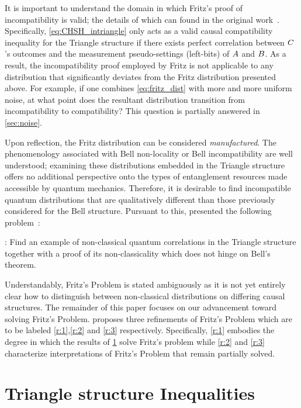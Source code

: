 \documentclass[aps, 10pt, english, twoside, pra, nofootinbib, tightenlines, longbibliography, superscriptaddress]{revtex4-1}
\begin{document}
    It is important to understand the domain in which Fritz's proof of incompatibility is valid; the details of which can found in the original work~\cite{Fritz_2012}. Specifically, \cref{eq:CHSH_intriangle} only acts as a valid causal compatibility inequality for the Triangle structure if there exists perfect correlation between $C$'s outcomes and the measurement pseudo-settings (left-bits) of $A$ and $B$. As a result, the incompatibility proof employed by Fritz is not applicable to any distribution that significantly deviates from the Fritz distribution presented above. For example, if one combines \cref{eq:fritz_dist} with more and more uniform noise, at what point does the resultant distribution transition from incompatibility to compatibility? This question is partially answered in \cref{sec:noise}.

    Upon reflection, the Fritz distribution can be considered \textit{manufactured}. The phenomenology associated with Bell non-locality or Bell incompatibility are well understood; examining these distributions embedded in the Triangle structure offers no additional perspective onto the types of entanglement resources made accessible by quantum mechanics. Therefore, it is desirable to find incompatible quantum distributions that are qualitatively different than those previously considered for the Bell structure. Pursuant to this, \citet{Fritz_2012} presented the following problem~\cite[Problem 2.17]{Fritz_2012}:%

    : Find an example of non-classical quantum correlations in the Triangle structure together with a proof of its non-classicality which does not hinge on Bell’s theorem.

    Understandably, Fritz's Problem is stated ambiguously as it is not yet entirely clear how to distinguish between non-classical distributions on differing causal structures. The remainder of this paper focuses on our advancement toward solving Fritz's Problem.  proposes three refinements of Fritz's Problem which are to be labeled \ref{r:1},\ref{r:2} and \ref{r:3} respectively. Specifically, \ref{r:1} embodies the degree in which the results of \cref{sec:found_inequalities} solve Fritz's problem while \ref{r:2} and \ref{r:3} characterize interpretations of Fritz's Problem that remain partially solved.

    \section{Triangle structure Inequalities}
    \label{sec:found_inequalities}
\end{document}

